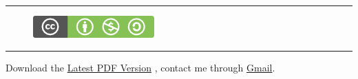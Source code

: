 \documentclass[letterpaper,10pt,english]{sphinxmanual}
\begin{document}
\bigskip\hrule{}\bigskip

\begin{figure}[htbp]
\centering
\href{http://creativecommons.org/licenses/by-nc-sa/3.0/us/}{\includegraphics{_static/cc_byncsa.png}}\end{figure}


\bigskip\hrule{}\bigskip


Download the \href{https://github.com/bczhu/phyx/raw/master/\_build/latex/Physics.pdf}{Latest PDF Version} , contact me through \href{mailto:bczhu1990@gmail.com}{Gmail}.



\renewcommand{\indexname}{Index}
\printindex
\end{document}
